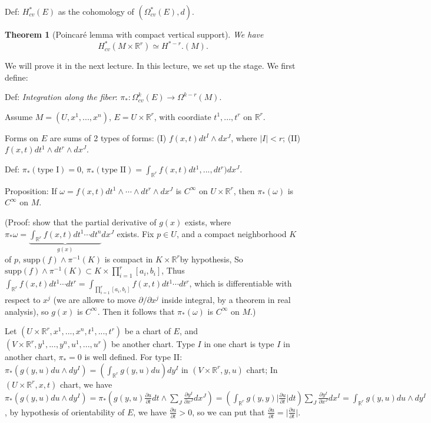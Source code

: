 \documentclass{article}
\theoremstyle{mystyle}
\newtheorem*{theorem*}{Theorem}
\theoremstyle{remark}
\numberwithin{equation}{section}
\begin{document}
Def: $H^*_{cv}(E)$ as the cohomology of $(\Omega^*_{cv}(E),d)$.

\begin{theorem*}[Poincar\'e lemma with compact vertical support] We have 
\begin{equation}\label{poincv}
H^*_{cv}(M\times \mathbb{R}^r)\simeq  H^{*-r}.(M).\end{equation}
\end{theorem*}
We will prove it in the next lecture. In this lecture, we set up the stage. We first define:

Def: \emph{Integration along the fiber}: $\pi_*\colon \Omega^k_{cv}(E)\rightarrow \Omega^{k-r}(M)$.

Assume $M = (U,x^1,...,x^n)$, $E = U\times \mathbb{R}^r$, with coordiate $t^1,...,t^r$ on $\mathbb{R}^r$.

Forms on $E$ are sums of 2 types of forms: (I) $f(x,t)dt^I\wedge d x^J$, where $|I|<r$; (II) $f(x,t) dt^1\wedge dt^r\wedge dx^J$. 

Def: $\pi_*(\text{type I}) = 0$, $\pi_*(\text{type II}) = \int_{\mathbb{R}^r} f(x,t)dt^1,...,dt^r)dx^J$. 

Proposition: If $\omega =f(x,t)dt^1\wedge \cdots \wedge d t^r\wedge dx^J$ is $C^\infty$ on $U\times \mathbb{R}^r$, then $\pi_*(\omega)$ is $C^\infty$ on $M$.

(Proof: show that the partial derivative of $g(x)$ exists, where $\pi_*\omega = \underbrace{\int_{\mathbb{R}^r}f(x,t)dt^1\cdots dt^n}_{g(x)}dx^J$ exists. Fix $p \in U$, and a compact neighborhood $K$ of $p$, $\text{supp}(f)\wedge \pi^{-1}(K)$ is compact in $K\times \mathbb{R}^r$by hypothesis, So $\text{supp}(f)\wedge \pi^{-1}(K) \subset K\times \prod_{i=1}^r [a_i,b_i]$, Thus $\int_{\mathbb{R}^r}f(x,t)dt^1\cdots dt^r = \int_{\prod_{i=1}^r[a_i,b_i]} f(x,t)dt^1\cdots dt^r$, which is differentiable with respect to $x^j$ (we are allowe to move $\partial/\partial x^j$ inside integral, by a theorem in real analysis), so $g(x)$ is $C^\infty$. Then it follows that $\pi_*(\omega)$ is $C^\infty$ on $M$.)


Let $(U\times \mathbb{R}^r,x^1,...,x^n,t^1,...,t^r)$ be a chart of $E$, and $(V\times \mathbb{R}^r,y^1,...,y^n,u^1,...,u^r)$ be another chart. Type $I$ in one chart is type $I$ in another chart, $\pi_*=0$ is well defined. For type II: $\pi_*(g(y,u)du\wedge dy^I) = \left(\int_{\mathbb{R}^r}g(y,u)du\right)dy^I$ in $(V\times \mathbb{R}^r,y,u)$ chart; In $(U\times \mathbb{R}^r,x,t)$ chart, we have $\pi_*(g(y,u)du\wedge dy^I) = \pi_*\left(g(y,u)\frac{\partial u}{\partial t} dt \wedge \sum_J \frac{\partial y^I}{\partial x^J}dx^J\right)
= \left(\int_{\mathbb{R}^r} g(y,y)\Big|\frac{\partial u}{\partial t}\Big| dt\right) \sum_J \frac{\partial y^I}{\partial x^J}dx^I
=\int_{\mathbb{R}^r} g(y,u)du\wedge dy^I$, by hypothesis of orientability of $E$, we have $\frac{\partial u}{\partial t}>0$, so we can put that $\frac{\partial u}{\partial t} = \Big|\frac{\partial u}{\partial t}\Big|$.
\end{document}
